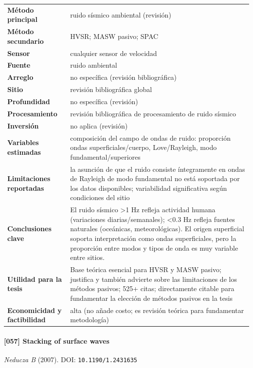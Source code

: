 \begin{center}\scriptsize
\begin{tabularx}{\textwidth}{@{}>{\bfseries}p{3.3cm} X@{}}
\toprule
M\'etodo principal & ruido sísmico ambiental (revisión) \\
M\'etodo secundario & HVSR; MASW pasivo; SPAC \\
Sensor & cualquier sensor de velocidad \\
Fuente & ruido ambiental \\
Arreglo & no específica (revisión bibliográfica) \\
Sitio & revisión bibliográfica global \\
Profundidad & no específica (revisión) \\
Procesamiento & revisión bibliográfica de procesamiento de ruido sísmico \\
Inversi\'on & no aplica (revisión) \\
Variables estimadas & composición del campo de ondas de ruido: proporción ondas superficiales/cuerpo, Love/Rayleigh, modo fundamental/superiores \\
Limitaciones reportadas & la asunción de que el ruido consiste íntegramente en ondas de Rayleigh de modo fundamental no está soportada por los datos disponibles; variabilidad significativa según condiciones del sitio \\
Conclusiones clave & El ruido sísmico >1 Hz refleja actividad humana (variaciones diarias/semanales); <0.3 Hz refleja fuentes naturales (oceánicas, meteorológicas). El origen superficial soporta interpretación como ondas superficiales, pero la proporción entre modos y tipos de onda es muy variable entre sitios. \\
Utilidad para la tesis & Base teórica esencial para HVSR y MASW pasivo; justifica y también advierte sobre las limitaciones de los métodos pasivos; 525+ citas; directamente citable para fundamentar la elección de métodos pasivos en la tesis \\
Economicidad y factibilidad & alta (no añade costo; es revisión teórica para fundamentar metodología) \\
\bottomrule
\end{tabularx}
\end{center}

\paragraph{[057] Stacking of surface waves} \emph{Neducza B} (2007).
{\scriptsize DOI: \texttt{10.1190/1.2431635}}

